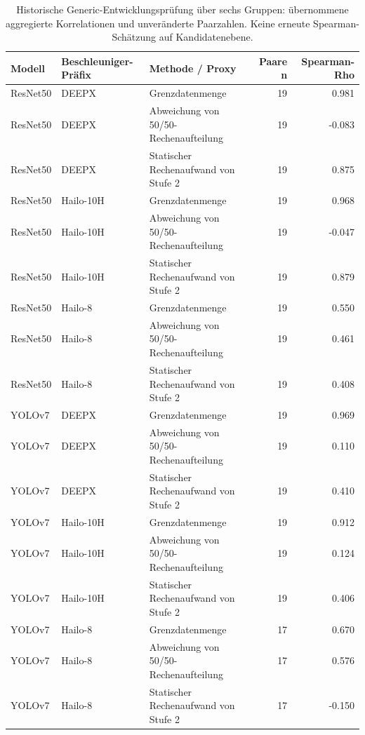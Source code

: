 \begin{longtable}{@{}llp{5.3cm}rr@{}}
\caption{Historische Generic-Entwicklungsprüfung über sechs Gruppen: übernommene aggregierte Korrelationen und unveränderte Paarzahlen. Keine erneute Spearman-Schätzung auf Kandidatenebene.}\\
\toprule
Modell & Beschleuniger-Präfix & Methode / Proxy & Paare n & Spearman-Rho \\
\midrule\endhead
ResNet50 & DEEPX & Grenzdatenmenge & 19 & 0.981 \\
ResNet50 & DEEPX & Abweichung von 50/50-Rechenaufteilung & 19 & -0.083 \\
ResNet50 & DEEPX & Statischer Rechenaufwand von Stufe 2 & 19 & 0.875 \\
ResNet50 & Hailo-10H & Grenzdatenmenge & 19 & 0.968 \\
ResNet50 & Hailo-10H & Abweichung von 50/50-Rechenaufteilung & 19 & -0.047 \\
ResNet50 & Hailo-10H & Statischer Rechenaufwand von Stufe 2 & 19 & 0.879 \\
ResNet50 & Hailo-8 & Grenzdatenmenge & 19 & 0.550 \\
ResNet50 & Hailo-8 & Abweichung von 50/50-Rechenaufteilung & 19 & 0.461 \\
ResNet50 & Hailo-8 & Statischer Rechenaufwand von Stufe 2 & 19 & 0.408 \\
YOLOv7 & DEEPX & Grenzdatenmenge & 19 & 0.969 \\
YOLOv7 & DEEPX & Abweichung von 50/50-Rechenaufteilung & 19 & 0.110 \\
YOLOv7 & DEEPX & Statischer Rechenaufwand von Stufe 2 & 19 & 0.410 \\
YOLOv7 & Hailo-10H & Grenzdatenmenge & 19 & 0.912 \\
YOLOv7 & Hailo-10H & Abweichung von 50/50-Rechenaufteilung & 19 & 0.124 \\
YOLOv7 & Hailo-10H & Statischer Rechenaufwand von Stufe 2 & 19 & 0.406 \\
YOLOv7 & Hailo-8 & Grenzdatenmenge & 17 & 0.670 \\
YOLOv7 & Hailo-8 & Abweichung von 50/50-Rechenaufteilung & 17 & 0.576 \\
YOLOv7 & Hailo-8 & Statischer Rechenaufwand von Stufe 2 & 17 & -0.150 \\
\bottomrule\end{longtable}
